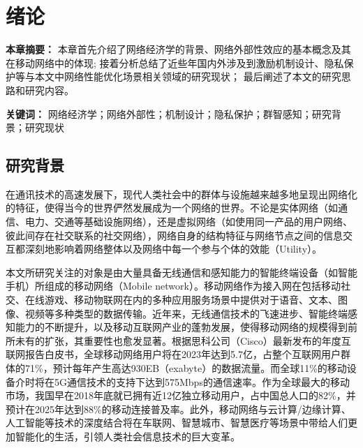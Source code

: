 \chapter{绪论}

\textbf{本章摘要：} 本章首先介绍了网络经济学的背景、网络外部性效应的基本概念及其在移动网络中的体现; 
接着分析总结了近些年国内外涉及到激励机制设计、隐私保护等与本文中网络性能优化场景相关领域的研究现状；
最后阐述了本文的研究思路和研究内容。

\textbf{关键词：} 网络经济学；网络外部性；机制设计；隐私保护；群智感知；研究背景；研究现状


\section{研究背景}

在通讯技术的高速发展下，现代人类社会中的群体与设施越来越多地呈现出网络化的特征，使得当今的世界俨然发展成为一个网络的世界。不论是实体网络（如通信、电力、交通等基础设施网络），还是虚拟网络（如使用同一产品的用户网络、彼此间存在社交联系的社交网络），网络自身的结构特征与网络节点之间的信息交互都深刻地影响着网络整体以及网络中每一个参与个体的效能（Utility）。

本文所研究关注的对象是由大量具备无线通信和感知能力的智能终端设备（如智能手机）所组成的移动网络（Mobile network）。移动网络作为接入网在包括移动社交、在线游戏、移动物联网在内的多种应用服务场景中提供对于语音、文本、图像、视频等多种类型的数据传输。近年来，无线通信技术的飞速进步、智能终端感知能力的不断提升，以及移动互联网产业的蓬勃发展，使得移动网络的规模得到前所未有的扩张，其重要性也愈发显著。根据思科公司（Cisco）最新发布的年度互联网报告白皮书\cite{Cisco2023}，全球移动网络用户将在2023年达到5.7亿，占整个互联网用户群体的71\%，预计每年产生高达930EB（exabyte）的数据流量。而全球11\%的移动设备介时将在5G通信技术的支持下达到575Mbps的通信速率。作为全球最大的移动市场，我国早在2018年底就已拥有近12亿独立移动用户，占中国总人口的82\%，并预计在2025年达到88\%的移动连接普及率\cite{GSMA}。此外，移动网络与云计算/边缘计算、人工智能等技术的深度结合将在车联网、智慧城市、智慧医疗等场景中带给人们更加智能化的生活，引领人类社会信息技术的巨大变革。

